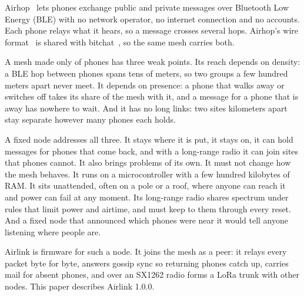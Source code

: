 \documentclass[conference]{IEEEtran}
\begin{document}
Airhop~\cite{airhop,airhopwp} lets phones exchange public and private messages over Bluetooth Low Energy (BLE) with no network operator, no internet connection and no accounts. Each phone relays what it hears, so a message crosses several hops. Airhop's wire format~\cite{airhopspec} is shared with bitchat~\cite{bitchat}, so the same mesh carries both.

A mesh made only of phones has three weak points. Its reach depends on density: a BLE hop between phones spans tens of meters, so two groups a few hundred meters apart never meet. It depends on presence: a phone that walks away or switches off takes its share of the mesh with it, and a message for a phone that is away has nowhere to wait. And it has no long links: two sites kilometers apart stay separate however many phones each holds.

A fixed node addresses all three. It stays where it is put, it stays on, it can hold messages for phones that come back, and with a long-range radio it can join sites that phones cannot. It also brings problems of its own. It must not change how the mesh behaves. It runs on a microcontroller with a few hundred kilobytes of RAM. It sits unattended, often on a pole or a roof, where anyone can reach it and power can fail at any moment. Its long-range radio shares spectrum under rules that limit power and airtime, and must keep to them through every reset. And a fixed node that announced which phones were near it would tell anyone listening where people are.

Airlink is firmware for such a node. It joins the mesh as a peer: it relays every packet byte for byte, answers gossip sync so returning phones catch up, carries mail for absent phones, and over an SX1262 radio forms a LoRa trunk with other nodes. This paper describes Airlink 1.0.0.
\end{document}
